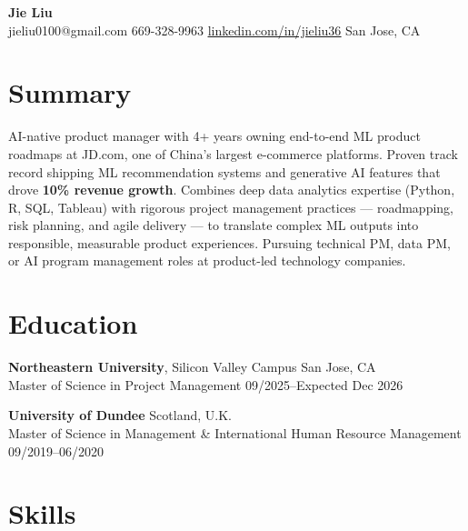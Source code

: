\documentclass[10pt, letterpaper]{article}
\newcommand{\linkedinlink}[2]{\href{#1}{\textcolor{accent}{\uline{#2}}}}
\begin{document}
\begin{center}
    {\LARGE\bfseries\color{primary} Jie Liu}\\[3pt]
    \small
    jieliu0100@gmail.com \textbar{}
    669-328-9963 \textbar{}
    \linkedinlink{https://www.linkedin.com/in/jieliu36/}{linkedin.com/in/jieliu36} \textbar{}
    San Jose, CA
\end{center}

\section{Summary}

AI-native product manager with 4+ years owning end-to-end ML product roadmaps at JD.com, one of China's largest e-commerce platforms. Proven track record shipping ML recommendation systems and generative AI features that drove \textbf{10\% revenue growth}. Combines deep data analytics expertise (Python, R, SQL, Tableau) with rigorous project management practices --- roadmapping, risk planning, and agile delivery --- to translate complex ML outputs into responsible, measurable product experiences. Pursuing technical PM, data PM, or AI program management roles at product-led technology companies.

\section{Education}

\textbf{Northeastern University}, Silicon Valley Campus \hfill San Jose, CA\\
Master of Science in Project Management \hfill 09/2025--Expected Dec 2026\\

\smallskip

\textbf{University of Dundee} \hfill Scotland, U.K.\\
Master of Science in Management \& International Human Resource Management \hfill 09/2019--06/2020

\section{Skills}
\end{document}
